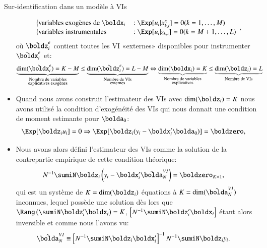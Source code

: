\begin{frame}[allowframebreaks]{Sur-identification dans un modèle à VIs}
\begin{itemize}
\[\begin{array}{ll}
    \left\{ \text{variables exogènes de $\boldx_i$}\right.
     &: \Exp[u_i|x_{k, i}^x] = 0 (k=1,\ldots, M)\\
    \left\{ \text{variables instrumentales}\right.&:\Exp[u_i|z_{k, i}] = 0(k=M +1,\ldots,L)
   \end{array},
\]
où $\tilde{\boldz}_i^e$ contient toutes les VI «externes» disponibles pour instrumenter 
$\tilde{\boldx}_i^e$ et:
\begin{align*}
    \underbrace{\dim(\tilde{\boldx}_i^e) = K-M}_{\substack{\text{Nombre de variables}\\ \text{explicatives exogènes}}}
     \leq  \underbrace{\dim(\tilde{\boldz}_i^e) = L-M }_{\substack{\text{Nombre de VIs}\\ \text{externes}}} & 
    \Leftrightarrow \underbrace{\dim(\boldx_i) = K }_{\substack{\text{Nombre de variables}\\ \text{explicatives}}} 
    \leq  \underbrace{\dim(\boldz_i) = L}_{\substack{\text{Nombre de VIs}}} 
\end{align*}

\framebreak

\item Quand nous avons construit l'estimateur des VIs avec $\dim(\boldz_i) = K$
nous avons utilisé la condition d'exogénéité des VIs qui nous donnait  une condition de moment 
estimante pour $\bolda_0$:
\begin{align*}
    \Exp[\boldz_iu_i] = 0&\Rightarrow \Exp[\boldz_i(y_i - \boldx_i^\prime \bolda_0)]=\boldzero,
\end{align*}
\item Nous avons alors défini l'estimateur des VIs comme la solution de la contrepartie 
empirique de cette condition théorique:
\begin{align*}
    N^{-1} \sumiN \boldz_i \left(y_i - \boldx_i^\prime\hat{\bolda}_N^{VI}\right)&=\boldzero_{K\times 1},
\end{align*}
qui est un système de $K=\dim(\boldz_i) $ équations à $K=\dim(\hat{\bolda}_N^{VI}) $ inconnues, 
lequel possède une solution dès lors que $\Rang\left(\sumiN \boldz_i^\prime\boldx_i \right) = K$, 
$\left[N^{-1}\sumiN \boldz_i^\prime\boldx_i \right]$ étant alors inversible et 
comme nous l'avons vu: 
\begin{align*}
    \hat{\bolda}_N^{VI}&\equiv
     \left[N^{-1}\sumiN \boldz_i\boldx_i^\prime \right]^{-1}N^{-1}\sumiN \boldz_iy_i.
\end{align*}

\framebreak


\end{itemize}
\end{frame}
